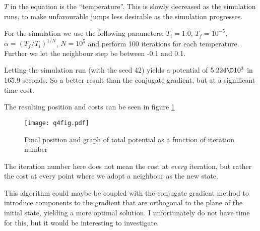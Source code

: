 \documentclass[a4paper,10pt]{article}
\begin{document}
	$ T $ in the equation is the ``temperature''. This is slowly decreased as the simulation runs, to make unfavourable jumps less desirable as the simulation progresses.
	
	For the simulation we use the following parameters: $ T_i = 1.0 $, $ T_f = 10^{-5} $, $\alpha = (T_f/T_i)^{1/N} $, $ N=10^5 $ and perform 100 iterations for each temperature. Further we let the neighbour step be between -0.1 and 0.1.
	
	Letting the simulation run (with the seed 42) yields a potential of $ 5.224 \D 10^{3} $ in 165.9 seconds. So a better result than the conjugate gradient, but at a significant time cost.
	
	The resulting position and costs can be seen in figure \ref{fig:q4fig}
	\begin{figure}[H]
		\centering
		\texttt{[image: q4fig.pdf]}
		\caption{Final position and graph of total potential as a function of iteration number}
		\label{fig:q4fig}
	\end{figure}
	The iteration number here does not mean the cost at \textit{every} iteration, but rather the cost at every point where we adopt a neighbour as the new state.
	
	This algorithm could maybe be coupled with the conjugate gradient method to introduce components to the gradient that are orthogonal to the plane of the initial state, yielding a more optimal solution. I unfortunately do not have time for this, but it would be interesting to investigate.
	
	
\end{document}
